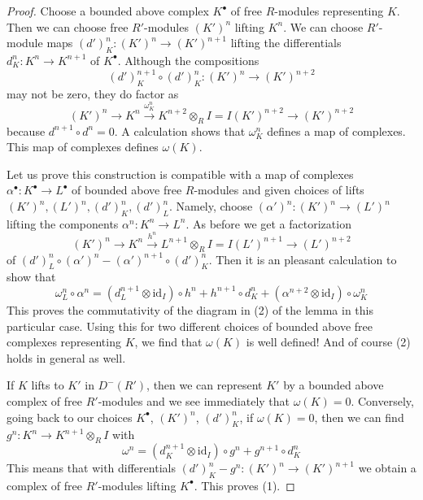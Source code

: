 \documentclass[10pt,a4paper]{amsart}
\theoremstyle{plain}
\theoremstyle{definition}
\theoremstyle{remark}
\numberwithin{equation}{subsection}
\begin{document}
\begin{proof}
Choose a bounded above complex $K^\bullet$ of free $R$-modules representing
$K$. Then we can choose free $R'$-modules $(K')^n$ lifting $K^n$.
We can choose $R'$-module maps $(d')^n_K : (K')^n \to (K')^{n + 1}$
lifting the differentials $d^n_K : K^n \to K^{n + 1}$ of $K^\bullet$.
Although the compositions
$$
(d')^{n + 1}_K \circ (d')^n_K : (K')^n \to (K')^{n + 2}
$$
may not be zero, they do factor as
$$
(K')^n \to K^n \xrightarrow{\omega^n_K}
K^{n + 2} \otimes_R I = I(K')^{n + 2} \to (K')^{n + 2}
$$
because $d^{n + 1} \circ d^n = 0$.
A calculation shows that $\omega^n_K$ defines a map of complexes.
This map of complexes defines $\omega(K)$.

\medskip\noindent
Let us prove this construction is compatible with a map of complexes
$\alpha^\bullet : K^\bullet \to L^\bullet$ of bounded above free $R$-modules
and given choices of lifts $(K')^n, (L')^n, (d')^n_K, (d')^n_L$.
Namely, choose $(\alpha')^n : (K')^n \to (L')^n$ lifting the
components $\alpha^n : K^n \to L^n$. As before we get a
factorization
$$
(K')^n \to K^n \xrightarrow{h^n}
L^{n + 1} \otimes_R I = I(L')^{n + 1} \to (L')^{n + 2}
$$
of $(d')^n_L \circ (\alpha')^n - (\alpha')^{n + 1} \circ (d')_K^n$.
Then it is an pleasant calculation to show that
$$
\omega^n_L \circ \alpha^n =
(d_L^{n + 1} \otimes \text{id}_I) \circ h^n + h^{n + 1} \circ d_K^n +
(\alpha^{n + 2} \otimes \text{id}_I) \circ \omega^n_K
$$
This proves the commutativity of the diagram in (2) of the lemma
in this particular case. Using this for two different choices
of bounded above free complexes representing $K$, we find that
$\omega(K)$ is well defined! And of course (2) holds in general as well.

\medskip\noindent
If $K$ lifts to $K'$ in $D^-(R')$, then we can represent
$K'$ by a bounded above complex of free $R'$-modules
and we see immediately that $\omega(K) = 0$.
Conversely, going back to our choices $K^\bullet$,
$(K')^n$, $(d')^n_K$, if $\omega(K) = 0$, then we can find
$g^n : K^n \to K^{n + 1} \otimes_R I$ with
$$
\omega^n = (d_K^{n + 1} \otimes \text{id}_I) \circ g^n +
g^{n + 1} \circ d_K^n
$$
This means that with differentials
$(d')^n_K - g^n : (K')^n \to (K')^{n + 1}$
we obtain a complex of free $R'$-modules lifting $K^\bullet$.
This proves (1).


\end{proof}
\end{document}
